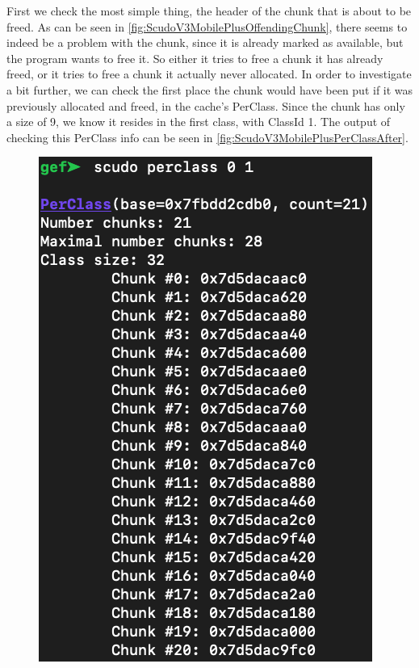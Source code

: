 \documentclass[a4paper,11pt,oneside]{report}
\begin{document}
First we check the most simple thing, the header of the chunk that is about
to be freed. As can be seen in \autoref{fig:ScudoV3MobilePlusOffendingChunk},
there seems to indeed be a problem with the chunk, since it is already marked
as available, but the program wants to free it. So either it tries to free a
chunk it has already freed, or it tries to free a chunk it actually never
allocated. In order to investigate a bit further, we can check the first place
the chunk would have been put if it was previously allocated and freed, in the
cache's PerClass. Since the chunk has only a size of 9, we know it resides in
the first class, with ClassId 1. The output of checking this PerClass info can
be seen in \autoref{fig:ScudoV3MobilePlusPerClassAfter}.

\begin{figure}[h!]
\centering
\begin{minipage}{.5\textwidth}
  \centering
  \includegraphics[width=.95\linewidth]{figures/ScudoV3MobilePlusPerClassAfter.png}

\end{minipage}
\end{figure}
\end{document}
